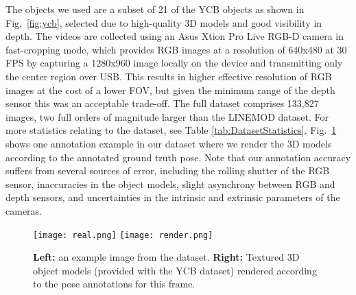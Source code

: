 \documentclass[conference]{IEEEtran}
\begin{document}
The objects we used are a subset of 21 of the YCB objects \cite{calli2015ycb} as shown in Fig.~\ref{fig:ycb}, selected due to high-quality 3D models and good visibility in depth. The videos are collected using an Asus Xtion Pro Live RGB-D camera in fast-cropping mode, which provides RGB images at a resolution of 640x480 at 30 FPS by capturing a 1280x960 image locally on the device and transmitting only the center region over USB. This results in higher effective resolution of RGB images at the cost of a lower FOV, but given the minimum range of the depth sensor this was an acceptable trade-off. The full dataset comprises 133,827 images, two full orders of magnitude larger than the LINEMOD dataset. For more statistics relating to the dataset, see Table \ref{tab:DatasetStatistics}. Fig.~\ref{fig:DatasetExample} shows one annotation example in our dataset where we render the 3D models according to the annotated ground truth pose. Note that our annotation accuracy suffers from several sources of error, including the rolling shutter of the RGB sensor, inaccuracies in the object models, slight asynchrony between RGB and depth sensors, and uncertainties in the intrinsic and extrinsic parameters of the cameras.



\begin{figure}
	\centering
	\texttt{[image: real.png]}
	\texttt{[image: render.png]}
	\caption{\small \textbf{Left:} an example image from the dataset. \textbf{Right:} Textured 3D object models (provided with the YCB dataset) rendered according to the pose annotations for this frame. }
	\label{fig:DatasetExample}
	\vspace{-4mm}
\end{figure}
\end{document}
